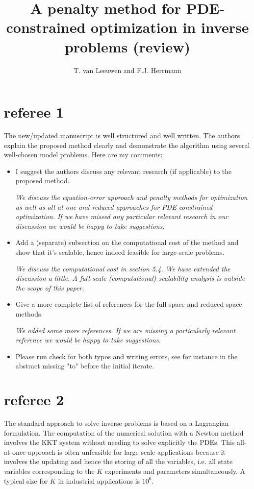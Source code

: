 \documentclass[12pt]{article}
\begin{document}
 
\title{A penalty method for PDE-constrained optimization in inverse problems (review)} 
\author{T. van Leeuwen and F.J. Herrmann} 
\date{} 
\maketitle 
\clearpage
\section{referee 1}
The new/updated manuscript is well structured and well written. The authors explain the proposed method clearly and demonstrate the algorithm using several well-chosen model problems. Here are my comments: 

\begin{itemize}
\item I suggest the authors discuss any relevant research (if applicable) to the proposed method. 

\vspace{5mm}\emph{We discuss the equation-error approach and penalty methods for optimization as well as all-at-one and reduced approaches for PDE-constrained optimization. If we have missed any particular relevant research in our discussion we would be happy to take suggestions.}



\item Add a (separate) subsection on the computational cost of the method and show that it's scalable, hence indeed feasible for large-scale problems. 

\vspace{5mm}
\emph{We discuss the computational cost in section 5.4. We have extended the discussion a little. A full-scale (computational) scalability analysis is outside the scope of this paper.}

\item Give a more complete list of references for the full space and reduced space methods. 

\vspace{5mm}
\emph{We added some more references. If we are missing a particularly relevant reference we would be happy to take suggestions.}


\item Please run check for both typos and writing errors, see for instance in the abstract missing "to" before the initial iterate. 
\end{itemize}
\clearpage
\section{referee 2}
The standard approach to solve inverse problems is based on a Lagrangian formulation. The computation of the numerical solution with a Newton method involves the 
KKT system without needing to solve explicitly the PDEs. This all-at-once approach is often unfeasible for large-scale applications because it involves the updating and hence the storing of all the variables, i.e. all state variables corresponding to the $K$ experiments and parameters simultaneously. A typical size for $K$ in industrial applications is $10^6$. 
\end{document}
